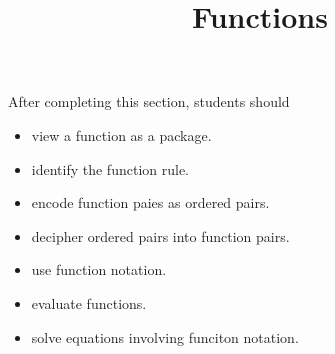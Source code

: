 \documentclass{ximera}
\title{Functions}
\begin{document}
\begin{abstract}
\end{abstract}
\maketitle

\begin{sectionOutcomes}
After completing this section, students should 

\begin{itemize}
\item view a function as a package.
\item identify the function rule.
\item encode function paies as ordered pairs.
\item decipher ordered pairs into function pairs.
\item use function notation.
\item evaluate functions.
\item solve equations involving funciton notation.
\end{itemize}
\end{sectionOutcomes}
\end{document}
